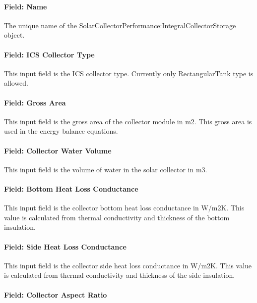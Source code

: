 \paragraph{Field: Name}\label{field-name-3-030}

The unique name of the SolarCollectorPerformance:IntegralCollectorStorage object.

\paragraph{Field: ICS Collector Type}\label{field-ics-collector-type}

This input field is the ICS collector type. Currently only RectangularTank type is allowed.

\paragraph{Field: Gross Area}\label{field-gross-area-1}

This input field is the gross area of the collector module in m2. This gross area is used in the energy balance equations.

\paragraph{Field: Collector Water Volume}\label{field-collector-water-volume}

This input field is the volume of water in the solar collector in m3.

\paragraph{Field: Bottom Heat Loss Conductance}\label{field-bottom-heat-loss-conductance}

This input field is the collector bottom heat loss conductance in W/m2K. This value is calculated from thermal conductivity and thickness of the bottom insulation.

\paragraph{Field: Side Heat Loss Conductance}\label{field-side-heat-loss-conductance}

This input field is the collector side heat loss conductance in W/m2K. This value is calculated from thermal conductivity and thickness of the side insulation.

\paragraph{Field: Collector Aspect Ratio}\label{field-collector-aspect-ratio}

